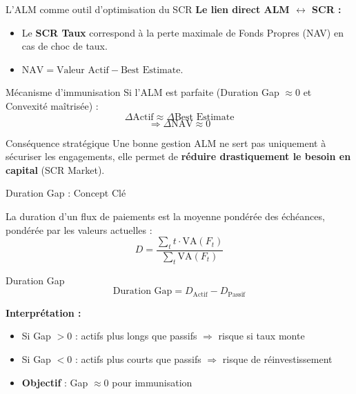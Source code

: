\documentclass[10pt,aspectratio=169]{beamer}
\begin{document}
\begin{frame}{L'ALM comme outil d'optimisation du SCR}
\textbf{Le lien direct ALM $\leftrightarrow$ SCR :}
\begin{itemize}
    \item Le \textbf{SCR Taux} correspond à la perte maximale de Fonds Propres (NAV) en cas de choc de taux.
    \item $\text{NAV} = \text{Valeur Actif} - \text{Best Estimate}$.
\end{itemize}

\vspace{0.3cm}
\begin{block}{Mécanisme d'immunisation}
Si l'ALM est parfaite (Duration Gap $\approx 0$ et Convexité maîtrisée) :
\[ \Delta \text{Actif} \approx \Delta \text{Best Estimate} \]
\[ \Rightarrow \Delta \text{NAV} \approx 0 \]
\end{block}

\vspace{0.3cm}
\begin{alertblock}{Conséquence stratégique}
Une bonne gestion ALM ne sert pas uniquement à sécuriser les engagements, elle permet de \textbf{réduire drastiquement le besoin en capital} (SCR Market).
\end{alertblock}
\end{frame}

\begin{frame}{Duration Gap : Concept Clé}
\begin{definition}[Duration]
La duration d'un flux de paiements est la moyenne pondérée des échéances, pondérée par les valeurs actuelles :
\[
D = \frac{\sum_{t} t \cdot \text{VA}(F_t)}{\sum_{t} \text{VA}(F_t)}
\]
\end{definition}

\vspace{0.3cm}
\begin{block}{Duration Gap}
\[
\text{Duration Gap} = D_{\text{Actif}} - D_{\text{Passif}}
\]

\textbf{Interprétation :}
\begin{itemize}
    \item Si Gap $> 0$ : actifs plus longs que passifs $\Rightarrow$ risque si taux monte
    \item Si Gap $< 0$ : actifs plus courts que passifs $\Rightarrow$ risque de réinvestissement
    \item \textbf{Objectif} : Gap $\approx 0$ pour immunisation
\end{itemize}
\end{block}
\end{frame}
\end{document}
